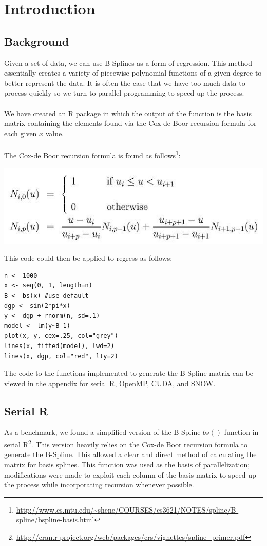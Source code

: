 \section{Introduction}

\subsection{Background}
Given a set of data, we can use B-Splines as a form of regression. This method essentially creates a variety of piecewise polynomial functions of a given degree to better represent the data. It is often the case that we have too much data to process quickly so we turn to parallel programming to speed up the process.
\\ \\
We have created an R package in which the output of the function is the basis matrix containing the elements found via the Cox-de Boor recursion formula for each given $x$ value. \\ \\ The Cox-de Boor recursion formula is found as follows\footnote{\url{http://www.cs.mtu.edu/~shene/COURSES/cs3621/NOTES/spline/B-spline/bspline-basis.html}}:
\begin{center} \includegraphics[scale=.6]{recursion.jpeg} \end{center}

This code could then be applied to regress as follows:
\begin{verbatim}
n <- 1000
x <- seq(0, 1, length=n)
B <- bs(x) #use default
dgp <- sin(2*pi*x)
y <- dgp + rnorm(n, sd=.1)
model <- lm(y~B-1)
plot(x, y, cex=.25, col="grey")
lines(x, fitted(model), lwd=2)
lines(x, dgp, col="red", lty=2)
\end{verbatim}

The code to the functions implemented to generate the B-Spline matrix can be viewed in the appendix for serial R, OpenMP, CUDA, and SNOW.

\subsection{Serial R} %
As a benchmark, we found a simplified version of the B-Spline $bs()$ function in serial R\footnote{\url{http://cran.r-project.org/web/packages/crs/vignettes/spline_primer.pdf}}.
This version heavily relies on the Cox-de Boor recursion formula to generate the B-Spline. This allowed a clear and direct method of calculating the matrix for basis splines. This function was used as the basis of parallelization; modifications were made to exploit each column of the basis matrix to speed up the process while incorporating recursion whenever possible.

